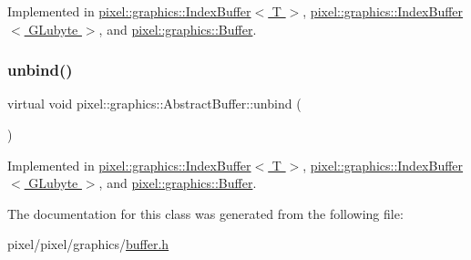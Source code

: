 Implemented in \hyperlink{classpixel_1_1graphics_1_1_index_buffer_a70b8fdbdd19c8800e005425712426bde}{pixel\+::graphics\+::\+Index\+Buffer$<$ T $>$}, \hyperlink{classpixel_1_1graphics_1_1_index_buffer_a70b8fdbdd19c8800e005425712426bde}{pixel\+::graphics\+::\+Index\+Buffer$<$ G\+Lubyte $>$}, and \hyperlink{classpixel_1_1graphics_1_1_buffer_ab157f01d131d8416126607f71ab320ce}{pixel\+::graphics\+::\+Buffer}.

\mbox{\label{classpixel_1_1graphics_1_1_abstract_buffer_aee49569fa5c1767a40f2371ec96e40fc}} 
\subsubsection{\texorpdfstring{unbind()}{unbind()}}
{\footnotesize\ttfamily virtual void pixel\+::graphics\+::\+Abstract\+Buffer\+::unbind (\begin{DoxyParamCaption}{ }\end{DoxyParamCaption})\hspace{0.3cm}{\ttfamily [pure virtual]}}



Implemented in \hyperlink{classpixel_1_1graphics_1_1_index_buffer_a5a90a44db73a048c76cf0fade5867621}{pixel\+::graphics\+::\+Index\+Buffer$<$ T $>$}, \hyperlink{classpixel_1_1graphics_1_1_index_buffer_a5a90a44db73a048c76cf0fade5867621}{pixel\+::graphics\+::\+Index\+Buffer$<$ G\+Lubyte $>$}, and \hyperlink{classpixel_1_1graphics_1_1_buffer_ac7b3cce29e02e3ee96322fee2ed8d624}{pixel\+::graphics\+::\+Buffer}.



The documentation for this class was generated from the following file\+:\begin{DoxyCompactItemize}
\item 
pixel/pixel/graphics/\hyperlink{buffer_8h}{buffer.\+h}\end{DoxyCompactItemize}
